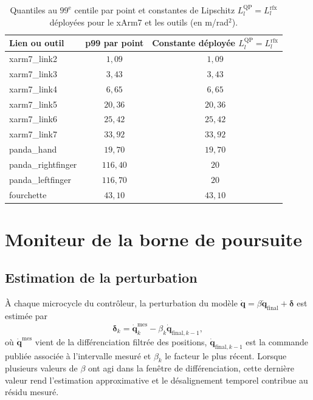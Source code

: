 \begin{table}[htbp]
\centering
\caption{Quantiles au $99^{\text{e}}$ centile par point et constantes de Lipschitz $L_l^{\mathrm{QP}} = L_l^{\mathrm{rfx}}$ déployées pour le xArm7 et les outils (en m/rad$^2$).}
\label{tab:lipschitz_xarm7}
\small
\begin{tabular}{lcc}
\hline
Lien ou outil & p99 par point & Constante déployée $L_l^{\mathrm{QP}}=L_l^{\mathrm{rfx}}$ \\ \hline
xarm7\_link2       & $1{,}09$  & $1{,}09$  \\
xarm7\_link3       & $3{,}43$  & $3{,}43$  \\
xarm7\_link4       & $6{,}65$  & $6{,}65$  \\
xarm7\_link5       & $20{,}36$ & $20{,}36$ \\
xarm7\_link6       & $25{,}42$ & $25{,}42$ \\
xarm7\_link7       & $33{,}92$ & $33{,}92$ \\
panda\_hand        & $19{,}70$ & $19{,}70$ \\
panda\_rightfinger & $116{,}40$ & $20$ \\
panda\_leftfinger  & $116{,}70$ & $20$ \\
fourchette         & $43{,}10$ & $43{,}10$ \\ \hline
\end{tabular}
\end{table}

\label{annexe:surveillance}

\section*{Moniteur de la borne de poursuite}

\subsection*{Estimation de la perturbation}

À chaque microcycle du contrôleur, la perturbation du modèle $\dot{\mathbf q}=\beta\dot{\mathbf q}_{\mathrm{final}}+\boldsymbol\delta$ est estimée par
\begin{equation}\label{eq:perturbation_estimee}
\widehat{\boldsymbol\delta}_k
=\dot{\mathbf q}^{\mathrm{mes}}_k
-\beta_k\dot{\mathbf q}_{\mathrm{final},k-1},
\end{equation}
où $\dot{\mathbf q}^{\mathrm{mes}}$ vient de la différenciation filtrée des positions, $\dot{\mathbf q}_{\mathrm{final},k-1}$ est la commande publiée associée à l'intervalle mesuré et $\beta_k$ le facteur le plus récent. Lorsque plusieurs valeurs de $\beta$ ont agi dans la fenêtre de différenciation, cette dernière valeur rend l'estimation approximative et le désalignement temporel contribue au résidu mesuré.

